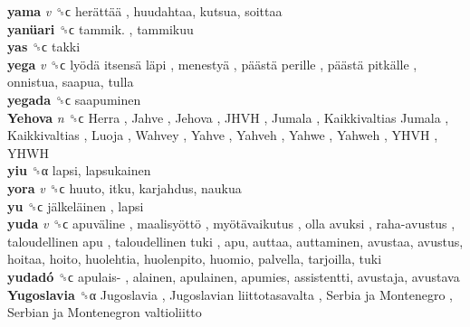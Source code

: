 \textbf{yama} \emph{v}  ␝ϲ   herättää , huudahtaa, kutsua, soittaa  \\
\textbf{yanüari} ␝ϲ   tammik. , tammikuu  \\
\textbf{yas} ␝ϲ  takki  \\
\textbf{yega} \emph{v}  ␝ϲ   lyödä itsensä läpi ,  menestyä ,  päästä perille ,  päästä pitkälle , onnistua, saapua, tulla  \\
\textbf{yegada} ␝ϲ  saapuminen  \\
\textbf{Yehova} \emph{n}  ␝ϲ   Herra ,  Jahve ,  Jehova ,  JHVH ,  Jumala ,  Kaikkivaltias Jumala ,  Kaikkivaltias ,  Luoja ,  Wahvey ,  Yahve ,  Yahveh ,  Yahwe ,  Yahweh ,  YHVH ,  YHWH   \\
\textbf{yiu} ␝α  lapsi, lapsukainen  \\
\textbf{yora} \emph{v}  ␝ϲ  huuto, itku, karjahdus, naukua  \\
\textbf{yu} ␝ϲ   jälkeläinen , lapsi  \\
\textbf{yuda} \emph{v}  ␝ϲ   apuväline ,  maalisyöttö ,  myötävaikutus ,  olla avuksi ,  raha-avustus ,  taloudellinen apu ,  taloudellinen tuki , apu, auttaa, auttaminen, avustaa, avustus, hoitaa, hoito, huolehtia, huolenpito, huomio, palvella, tarjoilla, tuki  \\
\textbf{yudadó} ␝ϲ   apulais- , alainen, apulainen, apumies, assistentti, avustaja, avustava  \\
\textbf{Yugoslavia} ␝α   Jugoslavia ,  Jugoslavian liittotasavalta ,  Serbia ja Montenegro ,  Serbian ja Montenegron valtioliitto   \\
